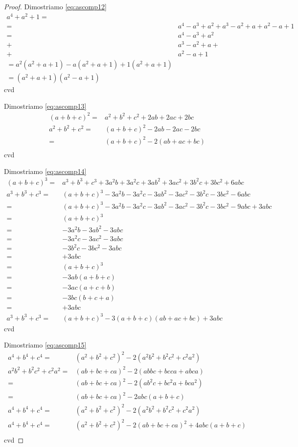 \begin{proof}
Dimostriamo \ref{eq:ascomp12}
\begin{align*}
a^4+a^2+1=&\\
=&a^4-a^3+a^2+a^3-a^2+a+a^2-a+1\\
=&a^4-a^3+a^2\\
+&a^3-a^2+a+\\
+&a^2-a+1\\
=a^2(a^2+a+1)-a(a^2+a+1)+1(a^2+a+1)\\
=(a^2+a+1)(a^2-a+1)
\end{align*}
cvd

Dimostriamo \ref{eq:ascomp13}
\begin{align*}
(a+b+c)^2=&a^2+b^2+c^2+2ab+2ac+2bc\\
a^2+b^2+c^2=&(a+b+c)^2-2ab-2ac-2bc\\
=&(a+b+c)^2-2(ab+ac+bc)\\
\end{align*}
cvd

Dimostriamo \ref{eq:ascomp14}
\begin{align*}
	(a+b+c)^3=&a^3+b^3+c^3+3a^2b+3a^2c+3ab^2+3ac^2+3b^2c+3bc^2+6abc\\
	a^3+b^3+c^3=&(a+b+c)^3-3a^2b-3a^2c-3ab^2-3ac^2-3b^2c-3bc^2-6abc\\
=&(a+b+c)^3-3a^2b-3a^2c-3ab^2-3ac^2-3b^2c-3bc^2-9abc+3abc\\
=&(a+b+c)^3\\
=&-3a^2b-3ab^2-3abc\\
=&-3a^2c-3ac^2-3abc\\
=&-3b^2c-3bc^2-3abc\\
=&+3abc\\
=&(a+b+c)^3\\
=&-3ab(a+b+c)\\
=&-3ac(a+c+b)\\
=&-3bc(b+c+a)\\
=&+3abc\\
a^3+b^3+c^3=&{}(a+b+c)^3-3(a+b+c)(ab+ac+bc)+3abc
\end{align*}
cvd

Dimostriamo \ref{eq:ascomp15}
\begin{align*}
	a^4+b^4+c^4=&(a^2+b^2+c^2)^2-2(a^2b^2+b^2c^2+c^2a^2)\\
	a^2b^2+b^2c^2+c^2a^2=&(ab+bc+ca)^2-2(abbc+bcca+abca)\\
	=&(ab+bc+ca)^2-2(ab^2c+bc^2a+bca^2)\\
	=&(ab+bc+ca)^2-2abc(a+b+c)\\
	a^4+b^4+c^4=&(a^2+b^2+c^2)^2-2(a^2b^2+b^2c^2+c^2a^2)\\
		a^4+b^4+c^4=&(a^2+b^2+c^2)^2-2(ab+bc+ca)^2+4abc(a+b+c)\\
\end{align*}
cvd
\end{proof}